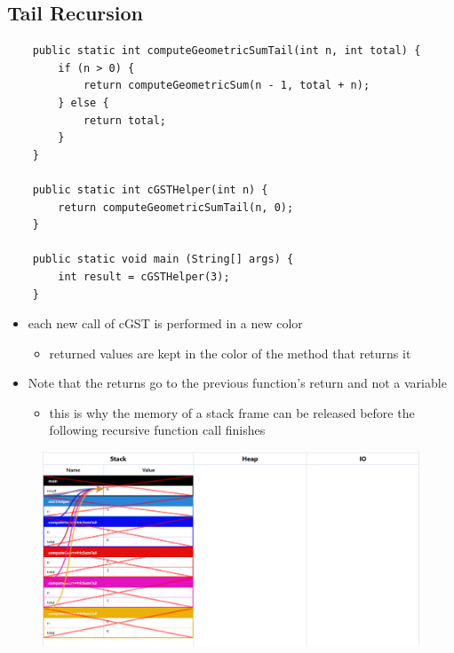 \documentclass{article}
\begin{document}
\pagebreak

\subsection{Tail Recursion}

\begin{verbatim}
	public static int computeGeometricSumTail(int n, int total) {
	    if (n > 0) {
	        return computeGeometricSum(n - 1, total + n);
	    } else {
	        return total;
	    }
	}

	public static int cGSTHelper(int n) {
	    return computeGeometricSumTail(n, 0);
	}

	public static void main (String[] args) {
	    int result = cGSTHelper(3);
	}
\end{verbatim}

\begin{itemize}
	\item each new call of cGST is performed in a new color
	\begin{itemize}
		\item returned values are kept in the color of the method that returns it
	\end{itemize}
	\item Note that the returns go to the previous function's return and not a variable
	\begin{itemize}
		\item this is why the memory of a stack frame can be released before
		the following recursive function call finishes
	\end{itemize}
\end{itemize}

\begin{figure}[H]
	\centering
	\includegraphics{recursionTail.png}
\end{figure}
\end{document}
